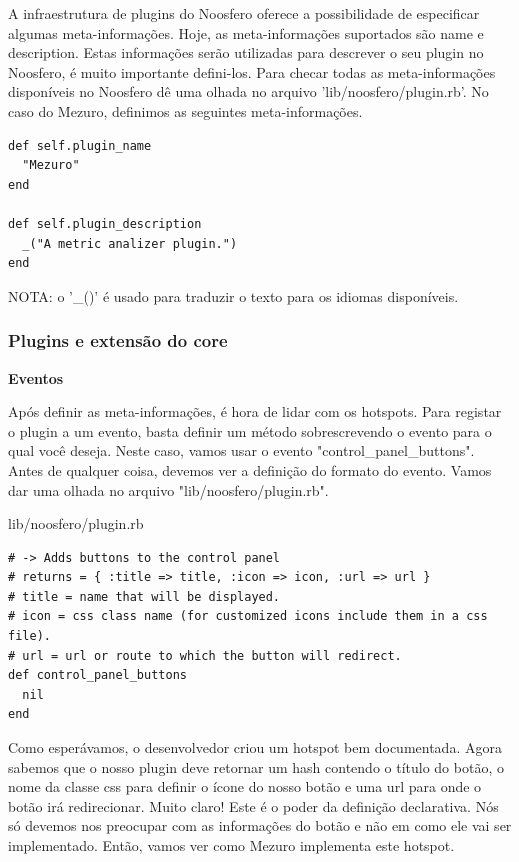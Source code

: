 \documentclass[11pt]{article}
\begin{document}
A infraestrutura de plugins do Noosfero oferece a possibilidade de especificar
algumas meta-informações. Hoje, as meta-informações suportados são name e
description. Estas informações serão utilizadas para descrever o seu plugin no
Noosfero, é muito importante defini-los. Para checar todas as meta-informações
disponíveis no Noosfero dê uma olhada no arquivo 'lib/noosfero/plugin.rb'. No
caso do Mezuro, definimos as seguintes meta-informações.

\begin{Verbatim}[frame=single,fontfamily=courier]
def self.plugin_name
  "Mezuro"
end
 
def self.plugin_description
  _("A metric analizer plugin.")
end
\end{Verbatim}

NOTA: o '\_()' é usado para traduzir o texto para os idiomas disponíveis.

\subsubsection{Plugins e extensão do core}

{\bf Eventos}

Após definir as meta-informações, é hora de lidar com os hotspots. Para
registar o plugin a um evento, basta definir um método sobrescrevendo o evento
para o qual você deseja. Neste caso, vamos usar o evento
"control\_panel\_buttons". Antes de qualquer coisa, devemos ver a definição do
formato do evento. Vamos dar uma olhada no arquivo "lib/noosfero/plugin.rb".

lib/noosfero/plugin.rb
\begin{Verbatim}[frame=single,fontfamily=courier]
# -> Adds buttons to the control panel
# returns = { :title => title, :icon => icon, :url => url }
# title = name that will be displayed.
# icon = css class name (for customized icons include them in a css file).
# url = url or route to which the button will redirect.
def control_panel_buttons
  nil
end
\end{Verbatim}

Como esperávamos, o desenvolvedor criou um hotspot bem documentada. Agora
sabemos que o nosso plugin deve retornar um hash contendo o título do botão, o
nome da classe css para definir o ícone do nosso botão e uma url para onde o
botão irá redirecionar. Muito claro! Este é o poder da definição declarativa.
Nós só devemos nos preocupar com as informações do botão e não em como ele vai
ser implementado. Então, vamos ver como Mezuro implementa este hotspot.
\end{document}
